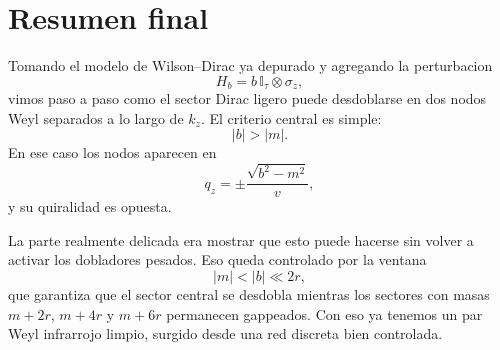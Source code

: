 \section{Resumen final}
Tomando el modelo de Wilson--Dirac ya depurado y agregando la perturbacion
\[
H_b = b\,\mathbb{I}_\tau\otimes \sigma_z,
\]
vimos paso a paso como el sector Dirac ligero puede desdoblarse en dos nodos Weyl separados a lo largo de \(k_z\). El criterio central es simple:
\[
|b|>|m|.
\]
En ese caso los nodos aparecen en
\[
q_z=\pm \frac{\sqrt{b^2-m^2}}{v},
\]
y su quiralidad es opuesta.

La parte realmente delicada era mostrar que esto puede hacerse sin volver a activar los dobladores pesados. Eso queda controlado por la ventana
\[
|m|<|b|\ll 2r,
\]
que garantiza que el sector central se desdobla mientras los sectores con masas \(m+2r\), \(m+4r\) y \(m+6r\) permanecen gappeados. Con eso ya tenemos un par Weyl infrarrojo limpio, surgido desde una red discreta bien controlada.
